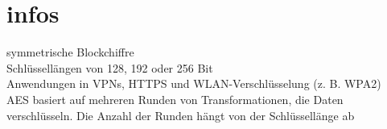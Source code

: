 \section{infos}
symmetrische Blockchiffre\\
Schlüssellängen von 128, 192 oder 256 Bit\\
Anwendungen in VPNs, HTTPS und WLAN-Verschlüsselung (z. B. WPA2)\\
AES basiert auf mehreren Runden von Transformationen, die Daten verschlüsseln. Die Anzahl der Runden hängt von der Schlüssellänge ab\\
